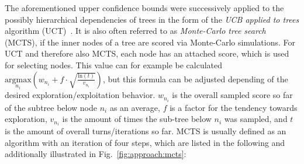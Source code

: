 The aforementioned upper confidence bounds were successively applied to the possibly hierarchical dependencies of trees in the form of the \textit{UCB applied to trees} algorithm (UCT)~\cite{Kocsis-UCT}.
It is also often referred to as \textit{Monte-Carlo tree search} (MCTS), if the inner nodes of a tree are scored via Monte-Carlo simulations.\newline
For UCT and therefore also MCTS, each node has an attached score, which is used for selecting nodes.
This value can for example be calculated $\underset{n_i}{\textrm{argmax}} \left( w_{n_i} + f \cdot \sqrt{\frac{\textrm{ln}(t)}{v_{n_i}}} \right)$, but this formula can be adjusted depending of the desired exploration/exploitation behavior.
$w_{n_i}$ is the overall sampled score so far of the subtree below node $n_i$ as an average, $f$ is a factor for the tendency towards exploration, $v_{n_i}$ is the amount of times the sub-tree below $n_i$ was sampled, and $t$ is the amount of overall turns/iterations so far.\newline
MCTS is usually defined as an algorithm with an iteration of four steps, which are listed in the following and additionally illustrated in Fig.~\ref{fig:approach:mcts}:
